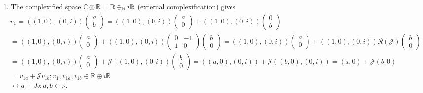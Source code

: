 \documentclass[aps,preprint]{revtex4}
\begin{document}
1. The complexified space $\mathbb{C\otimes R}$ $=\mathbb{R}\oplus _{\mathbb{%
R}}i\mathbb{R}$ (external complexification) gives 
\begin{gather}
v_{1}=\left( \left( 1,0\right) ,\left( 0,i\right) \right) \left( 
\begin{array}{c}
a \\ 
b%
\end{array}%
\right) =\left( \left( 1,0\right) ,\left( 0,i\right) \right) \left( 
\begin{array}{c}
a \\ 
0%
\end{array}%
\right) +\left( \left( 1,0\right) ,\left( 0,i\right) \right) \left( 
\begin{array}{c}
0 \\ 
b%
\end{array}%
\right) \\
=\left( \left( 1,0\right) ,\left( 0,i\right) \right) \left( 
\begin{array}{c}
a \\ 
0%
\end{array}%
\right) +\left( \left( 1,0\right) ,\left( 0,i\right) \right) \left( 
\begin{array}{cc}
0 & -1 \\ 
1 & 0%
\end{array}%
\right) \left( 
\begin{array}{c}
b \\ 
0%
\end{array}%
\right) =\left( \left( 1,0\right) ,\left( 0,i\right) \right) \left( 
\begin{array}{c}
a \\ 
0%
\end{array}%
\right) +\left( \left( 1,0\right) ,\left( 0,i\right) \right) \mathcal{R}%
\left( \mathcal{J}\right) \left( 
\begin{array}{c}
b \\ 
0%
\end{array}%
\right) \\
=\left( \left( 1,0\right) ,\left( 0,i\right) \right) \left( 
\begin{array}{c}
a \\ 
0%
\end{array}%
\right) +\mathcal{J}\left( \left( 1,0\right) ,\left( 0,i\right) \right)
\left( 
\begin{array}{c}
b \\ 
0%
\end{array}%
\right) =\left( \left( a,0\right) ,\left( 0,i\right) \right) +\mathcal{J}%
\left( \left( b,0\right) ,\left( 0,i\right) \right) =\left( a,0\right) +%
\mathcal{J}\left( b,0\right) \\
=v_{1a}+\mathcal{J}v_{1b};v_{1},v_{1a},v_{1b}\in \mathbb{R\oplus }i\mathbb{R}
\\
\longleftrightarrow a+Jb;a,b\in \mathbb{R}.
\end{gather}%
\end{document}

